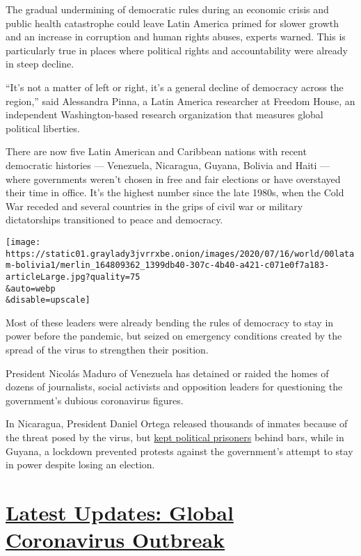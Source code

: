 The gradual undermining of democratic rules during an economic crisis
and public health catastrophe could leave Latin America primed for
slower growth and an increase in corruption and human rights abuses,
experts warned. This is particularly true in places where political
rights and accountability were already in steep decline.

``It's not a matter of left or right, it's a general decline of
democracy across the region,'' said Alessandra Pinna, a Latin America
researcher at Freedom House, an independent Washington-based research
organization that measures global political liberties.

There are now five Latin American and Caribbean nations with recent
democratic histories --- Venezuela, Nicaragua, Guyana, Bolivia and Haiti
--- where governments weren't chosen in free and fair elections or have
overstayed their time in office. It's the highest number since the late
1980s, when the Cold War receded and several countries in the grips of
civil war or military dictatorships transitioned to peace and democracy.

\texttt{[image: https://static01.graylady3jvrrxbe.onion/images/2020/07/16/world/00latam-bolivia1/merlin\_164809362\_1399db40-307c-4b40-a421-c071e0f7a183-articleLarge.jpg?quality=75\\\&auto=webp\\\&disable=upscale]}

Most of these leaders were already bending the rules of democracy to
stay in power before the pandemic, but seized on emergency conditions
created by the spread of the virus to strengthen their position.

President Nicolás Maduro of Venezuela has detained or raided the homes
of dozens of journalists, social activists and opposition leaders for
questioning the government's dubious coronavirus figures.

In Nicaragua, President Daniel Ortega released thousands of inmates
because of the threat posed by the virus, but
\href{https://www.barrons.com/news/nicaragua-excludes-political-prisoners-from-mass-release-01586430304}{kept
political prisoners} behind bars, while in Guyana, a lockdown prevented
protests against the government's attempt to stay in power despite
losing an election.

\hypertarget{latest-updates-global-coronavirus-outbreak}{%
\section{\texorpdfstring{\href{https://www.nytimes3xbfgragh.onion/2020/08/01/world/coronavirus-covid-19.html?action=click\&pgtype=Article\&state=default\&region=MAIN_CONTENT_1\&context=storylines_live_updates}{Latest
Updates: Global Coronavirus
Outbreak}}{Latest Updates: Global Coronavirus Outbreak}}\label{latest-updates-global-coronavirus-outbreak}}

